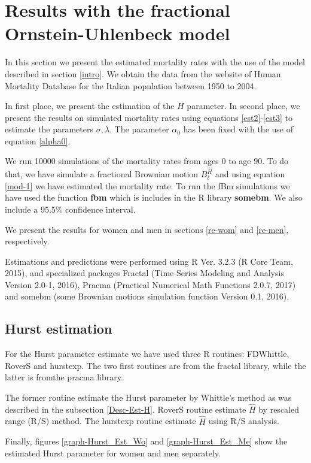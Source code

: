 \documentclass[smallextended]{svjour3}
\begin{document}
\section{Results with the fractional Ornstein-Uhlenbeck model}
\label{re-fou}

In this section we present the estimated mortality rates with the use of the
model
described in section \ref{intro}. We obtain the data from the website of Human
Mortality Database for the Italian population between 1950 to 2004.

In first place, we present the estimation of the $H$ parameter. In second
place, we present the results on simulated mortality rates using  equations
\eqref{est2}-\eqref{est3} to estimate the parameters $\sigma,\lambda$. The
parameter $\alpha_0$ has been fixed with the use of equation \eqref{alpha0}.

We run 10000 simulations of the mortality rates from ages $0$ to age $90$. To
do that, we have simulate a fractional Brownian motion $B_t^{\hat H}$ and using
equation \eqref{mod-1} we have estimated the mortality rate. To run the fBm
simulations we have used the function {\bf fbm} which is includes in the R
library {\bf somebm}.  We also include a  95.5\% confidence interval.


We present the results for women and men in sections \ref{re-wom} and
\ref{re-men}, respectively.

Estimations and predictions were performed using R Ver. 3.2.3 (R Core Team,
2015), and specialized packages
Fractal (Time Series Modeling and Analysis
Version 2.0-1, 2016), Pracma (Practical Numerical Math Functions 2.0.7, 2017)
and somebm (some Brownian motions simulation function Version 0.1, 2016).


\subsection{Hurst estimation}\label{hu-est}

	For the Hurst parameter estimate we have used three R routines: FDWhittle,
RoverS and hurstexp. The two first routines are from the fractal library, 
while the latter is fromthe pracma library.

	The former routine estimate the Hurst parameter by Whittle's method as was
described in the subsection \ref{Desc-Est-H}. RoverS routine
estimate $\hat H $ by rescaled range (R/S) method. The hurstexp routine
estimate $\hat H $  using
R/S analysis. 

Finally, figures \ref{graph-Hurst_Est_Wo} and \ref{graph-Hurst_Est_Me} show
the estimated Hurst parameter for women and men separately.
\end{document}
